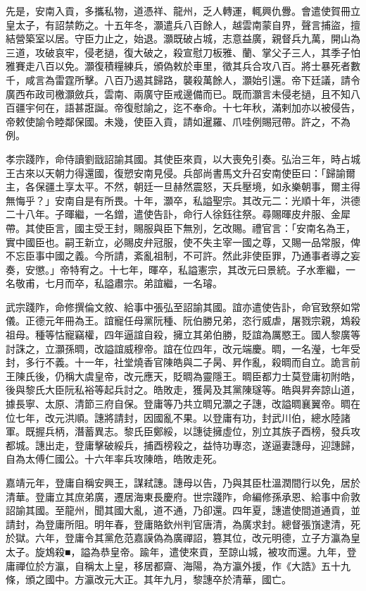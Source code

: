 \begin{pinyinscope}
先是，安南入貢，多攜私物，道憑祥、龍州，乏人轉運，輒興仇釁。會遣使賀冊立皇太子，有詔禁飭之。十五年冬，灝遣兵八百餘人，越雲南蒙自界，聲言捕盜，擅結營築室以居。守臣力止之，始退。灝既破占城，志意益廣，親督兵九萬，開山為三道，攻破哀牢，侵老撾，復大破之，殺宣慰刀板雅、蘭、掌父子三人，其季子怕雅賽走八百以免。灝復積糧練兵，頒偽敕於車里，徵其兵合攻八百。將士暴死者數千，咸言為雷霆所擊。八百乃遏其歸路，襲殺萬餘人，灝始引還。帝下廷議，請令廣西布政司檄灝斂兵，雲南、兩廣守臣戒邊備而已。既而灝言未侵老撾，且不知八百疆宇何在，語甚誑誕。帝復慰諭之，迄不奉命。十七年秋，滿剌加亦以被侵告，帝敕使諭令睦鄰保國。未幾，使臣入貢，請如暹羅、爪哇例賜冠帶。許之，不為例。

孝宗踐阼，命侍讀劉戩詔諭其國。其使臣來貢，以大喪免引奏。弘治三年，時占城王古來以天朝力得還國，復愬安南見侵。兵部尚書馬文升召安南使臣曰：「歸諭爾主，各保疆土享太平。不然，朝廷一旦赫然震怒，天兵壓境，如永樂朝事，爾主得無悔乎？」安南自是有所畏。十年，灝卒，私謚聖宗。其改元二：光順十年，洪德二十八年。子暉繼，一名鏳，遣使告訃，命行人徐鈺往祭。尋賜暉皮弁服、金犀帶。其使臣言，國主受王封，賜服與臣下無別，乞改賜。禮官言：「安南名為王，實中國臣也。嗣王新立，必賜皮弁冠服，使不失主宰一國之尊，又賜一品常服，俾不忘臣事中國之義。今所請，紊亂祖制，不可許。然此非使臣罪，乃通事者導之妄奏，安懲。」帝特宥之。十七年，暉卒，私謚憲宗，其改元曰景統。子水牽繼，一名敬甫，七月而卒，私謚肅宗。弟誼繼，一名璿。

武宗踐阼，命修撰倫文敘、給事中張弘至詔諭其國。誼亦遣使告訃，命官致祭如常儀。正德元年冊為王。誼寵任母黨阮種、阮伯勝兄弟，恣行威虐，屠戮宗親，鴆殺祖母。種等怙寵竊權，四年逼誼自殺，擁立其弟伯勝，貶誼為厲愍王。國人黎廣等討誅之，立灝孫晭，改謚誼威穆帝。誼在位四年，改元端慶。晭，一名瀅，七年受封，多行不義。十一年，社堂燒香官陳皓與二子昺、昇作亂，殺晭而自立。詭言前王陳氏後，仍稱大虞皇帝，改元應天，貶晭為靈隱王。晭臣都力士莫登庸初附皓，後與黎氏大臣阮私裕等起兵討之。皓敗走，獲昺及其黨陳璲等。皓與昇奔諒山道，據長寧、太原、清節三府自保。登庸等乃共立晭兄灝之子譓，改謚晭襄翼帝。晭在位七年，改元洪順。譓將請封，因國亂不果。以登庸有功，封武川伯，總水陸諸軍。既握兵柄，潛蓄異志。黎氏臣鄭綏，以譓徒擁虛位，別立其族子酉榜，發兵攻都城。譓出走，登庸擊破綏兵，捕酉榜殺之，益恃功專恣，遂逼妻譓母，迎譓歸，自為太傅仁國公。十六年率兵攻陳皓，皓敗走死。

嘉靖元年，登庸自稱安興王，謀弒譓。譓母以告，乃與其臣杜溫潤間行以免，居於清華。登庸立其庶弟廣，遷居海東長慶府。世宗踐阼，命編修孫承恩、給事中俞敦詔諭其國。至龍州，聞其國大亂，道不通，乃卻還。四年夏，譓遣使間道通貢，並請封，為登庸所阻。明年春，登庸賂欽州判官唐清，為廣求封。總督張嵿逮清，死於獄。六年，登庸令其黨危范嘉謨偽為廣禪詔，篡其位，改元明德，立子方瀛為皇太子。旋鴆殺■，謚為恭皇帝。踰年，遣使來貢，至諒山城，被攻而還。九年，登庸禪位於方瀛，自稱太上皇，移居都齋、海陽，為方瀛外援，作《大誥》五十九條，頒之國中。方瀛改元大正。其年九月，黎譓卒於清華，國亡。


\end{pinyinscope}

